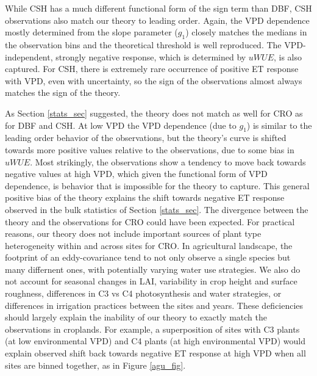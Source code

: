 \documentclass[draft,linenumbers]{gcbjournal}
\begin{document}
While CSH has a much different functional form of the sign term than DBF, CSH observations also match our theory to leading order. Again, the VPD dependence mostly determined from the slope parameter ($g_1$) closely matches the medians in the observation bins and the theoretical threshold is well reproduced. The VPD-independent, strongly negative response, which is determined by $uWUE$, is also captured. For CSH, there is extremely rare occurrence of positive ET response with VPD, even with uncertainty, so the sign of the observations almost always matches the sign of the theory.

As Section \ref{stats_sec} suggested, the theory does not match as well for CRO as for DBF and CSH. At low VPD the VPD dependence (due to $g_1$) is similar to the leading order behavior of the observations, but the theory's curve is shifted towards more positive values relative to the observations, due to some bias in $uWUE$. Most strikingly, the observations show a tendency to move back towards negative values at high VPD, which given the functional form of VPD dependence, is behavior that is impossible for the theory to capture. This general positive bias of the theory explains the shift towards negative ET response observed in the bulk statistics of Section \ref{stats_sec}. The divergence between the theory and the observations for CRO could have been expected. For practical reasons, our theory does not include important sources of plant type heterogeneity within and across sites for CRO. In agricultural landscape, the footprint of an eddy-covariance tend to not only observe a single species but many differnent ones, with potentially varying water use strategies. We also do not account for seasonal changes in LAI, variability in crop height and surface roughness, differences in C3 vs C4 photosynthesis and water strategies, or differences in irrigation practices between the sites and years. These deficiencies should largely explain the inability of our theory to exactly match the observations in croplands. For example, a superposition of sites with C3 plants (at low environmental VPD) and C4 plants (at high environmental VPD) would explain observed shift back towards negative ET response at high VPD when all sites are binned together, as in Figure \ref{agu_fig}.  
\end{document}
